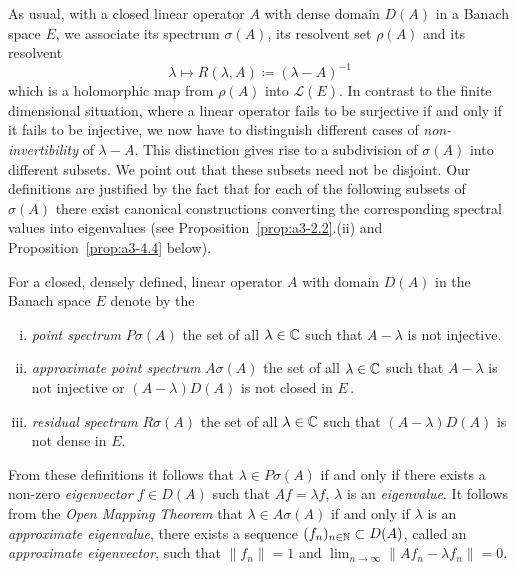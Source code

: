 As usual, with a closed linear operator $A$ with dense domain $D(A)$ in a Banach space $E$, we associate its spectrum $\sigma(A)$, its resolvent set $\rho(A)$ and its resolvent
\[
    \lambda \mapsto R(\lambda,A) \coloneqq (\lambda - A)^{-1}
\]
which is a holomorphic map from $\rho(A)$ into $\mathcal{L}(E)$.
In contrast to the finite dimensional situation, where a linear operator fails to be surjective if and only if it fails to be injective, we now have to distinguish different cases of \emph{non-invertibility} of $\lambda - A$.
This distinction gives rise to a subdivision of $\sigma(A)$ into different subsets.
We point out that these subsets need not be disjoint. Our definitions are
justified by the fact that for each of the following subsets of $\sigma(A)$ there exist canonical constructions converting the corresponding spectral values into eigenvalues (see Proposition~\ref{prop:a3-2.2}.(ii) and Proposition~\ref{prop:a3-4.4} below).
\begin{definition}\label{def:a3-2.1}
For a closed, densely defined, linear operator $A$ with domain $D(A)$ in the Banach space $E$ denote by the
\begin{enumerate}[(i)]
\item 
\emph{point spectrum} $P\sigma(A)$ the set of all $\lambda \in \mathbb{C}$ such that 
$A - \lambda$ is not injective.

\item 
\emph{approximate point spectrum} $A\sigma(A)$ the set of all $\lambda \in \mathbb{C}$ such that $A - \lambda$ is not injective or $(A - \lambda)D(A)$ is not closed in $E$\,.

\item 
\emph{residual spectrum} $R\sigma(A)$ the set of all $\lambda \in \mathbb{C}$ such that $(A - \lambda)D(A)$ is not dense in $E$.
\end{enumerate}
\end{definition}
From these definitions it follows that $\lambda \in P\sigma(A)$ if and only if there exists a non-zero \emph{eigenvector} $f \in D(A)$ such that $Af = \lambda f$, \ie $\lambda$ is an \emph{eigenvalue}.
It follows from the \emph{Open Mapping Theorem} that $\lambda \in A\sigma(A)$ if and only if $\lambda$ is an \emph{approximate eigenvalue}, \ie there exists a sequence $(f_{n})_{n \in \mathbb{N}} \subset D(A)$, called an\emph{ approximate eigenvector}, such that $\|f_{n}\| = 1$ and $ \lim_{n \to \infty} \|Af_{n} - \lambda f_{n}\| = 0$.


